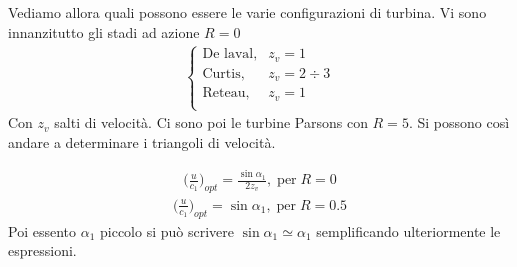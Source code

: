 Vediamo allora quali possono essere le varie configurazioni di turbina. 
Vi sono innanzitutto gli stadi ad azione $R = 0$
\begin{align*}
\begin{cases}
\mbox{De laval}, & z_v = 1\\
\mbox{Curtis}, & z_v = 2 \div 3\\
\mbox{Reteau}, & z_v = 1\\
\end{cases}
\end{align*}
Con $z_v$ salti di velocità. Ci sono poi le turbine Parsons con $R = 5$. Si possono così andare a determinare i triangoli di velocità.

\begin{align*}
\bigg( \frac{u}{c_1} \bigg)_{opt} = \frac{\sin \alpha_1}{2 z_v}, \; \mbox{per} \; R = 0
\end{align*}
\begin{align*}
\bigg( \frac{u}{c_1} \bigg)_{opt} = \sin \alpha_1, \; \mbox{per} \; R = 0.5
\end{align*}
Poi essento $\alpha_1$ piccolo si può scrivere $ \sin \alpha_1 \simeq \alpha_1$ semplificando ulteriormente le espressioni.

